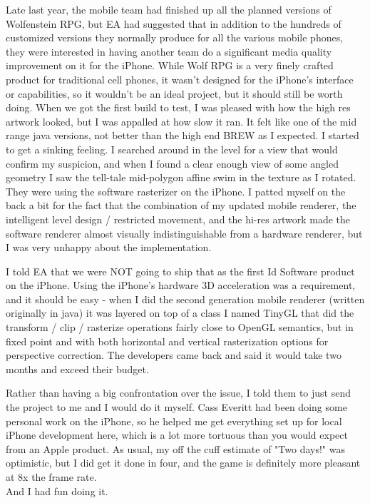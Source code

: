 \documentclass[book.tex]{subfiles}
\begin{document}
Late last year, the mobile team had finished up all the planned versions of Wolfenstein RPG, but EA had suggested that in addition to the hundreds of customized versions they normally produce for all the various mobile phones, they were interested in having another team do a significant media quality improvement on it for the iPhone.  While Wolf RPG is a very finely crafted product for traditional cell phones, it wasn't designed for the iPhone's interface or capabilities, so it wouldn't be an ideal project, but it should still be worth doing.  When we got the first build to test, I was pleased with how the high res artwork looked, but I was appalled at how slow it ran.  It felt like one of the mid range java versions, not better than the high end BREW as I expected.  I started to get a sinking feeling.  I searched around in the level for a view that would confirm my suspicion, and when I found a clear enough view of some angled geometry I saw the tell-tale mid-polygon affine swim in the texture as I rotated.  They were using the software rasterizer on the iPhone.  I patted myself on the back a bit for the fact that the combination of my updated mobile renderer, the intelligent level design / restricted movement, and the hi-res artwork made the software renderer almost visually indistinguishable from a hardware renderer, but I was very unhappy about the implementation.\\
\par

I told EA that we were NOT going to ship that as the first Id Software product on the iPhone.  Using the iPhone's hardware 3D acceleration was a requirement, and it should be easy - when I did the second generation mobile renderer (written originally in java) it was layered on top of a class I named TinyGL that did the transform / clip / rasterize operations fairly close to OpenGL semantics, but in fixed point and with both horizontal and vertical rasterization options for perspective correction.  The developers came back and said it would take two months and exceed their budget.\\
\par

Rather than having a big confrontation over the issue, I told them to just send the project to me and I would do it myself.  Cass Everitt had been doing some personal work on the iPhone, so he helped me get everything set up for local iPhone development here, which is a lot more tortuous than you would expect from an Apple product.  As usual, my off the cuff estimate of "Two days!" was optimistic, but I did get it done in four, and the game is definitely more pleasant at 8x the frame rate.\\
And I had fun doing it.\\
\par
\end{document}
